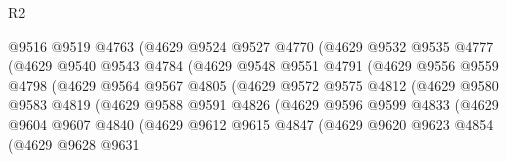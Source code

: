 \begin{lexlean}{R2}
\begin{coremodule}
                          @9516
                          @9519
                          @4763
                          (@4629
                            @9524
                            @9527
                            @4770
                            (@4629
                              @9532
                              @9535
                              @4777
                              (@4629
                                @9540
                                @9543
                                @4784
                                (@4629
                                  @9548
                                  @9551
                                  @4791
                                  (@4629
                                    @9556
                                    @9559
                                    @4798
                                    (@4629
                                      @9564
                                      @9567
                                      @4805
                                      (@4629
                                        @9572
                                        @9575
                                        @4812
                                        (@4629
                                          @9580
                                          @9583
                                          @4819
                                          (@4629
                                            @9588
                                            @9591
                                            @4826
                                            (@4629
                                              @9596
                                              @9599
                                              @4833
                                              (@4629
                                                @9604
                                                @9607
                                                @4840
                                                (@4629
                                                  @9612
                                                  @9615
                                                  @4847
                                                  (@4629
                                                    @9620
                                                    @9623
                                                    @4854
                                                    (@4629
                                                      @9628
                                                      @9631

\end{coremodule}
\end{lexlean}
